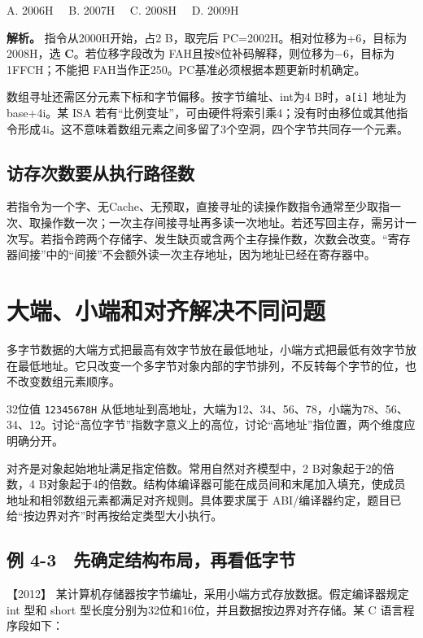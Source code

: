 A. 2006H　 B. 2007H　 C. 2008H　 D. 2009H


\textbf{解析。} 指令从2000H开始，占2 B，取完后 PC=2002H。相对位移为+6，目标为2008H，选 \textbf{C}。若位移字段改为 FAH且按8位补码解释，则位移为−6，目标为1FFCH；不能把 FAH当作正250。PC基准必须根据本题更新时机确定。

数组寻址还需区分元素下标和字节偏移。按字节编址、int为4 B时，\texttt{a{[}i{]}} 地址为base+4i。某 ISA 若有``比例变址''，可由硬件将索引乘4；没有时由移位或其他指令形成4i。这不意味着数组元素之间多留了3个空洞，四个字节共同存一个元素。

\subsection{访存次数要从执行路径数}\label{co-c04-h50}

若指令为一个字、无Cache、无预取，直接寻址的读操作数指令通常至少取指一次、取操作数一次；一次主存间接寻址再多读一次地址。若还写回主存，需另计一次写。若指令跨两个存储字、发生缺页或含两个主存操作数，次数会改变。``寄存器间接''中的``间接''不会额外读一次主存地址，因为地址已经在寄存器中。

\section{大端、小端和对齐解决不同问题}\label{co-04-03}

多字节数据的大端方式把最高有效字节放在最低地址，小端方式把最低有效字节放在最低地址。它只改变一个多字节对象内部的字节排列，不反转每个字节的位，也不改变数组元素顺序。

32位值 \texttt{12345678H} 从低地址到高地址，大端为12、34、56、78，小端为78、56、34、12。讨论``高位字节''指数字意义上的高位，讨论``高地址''指位置，两个维度应明确分开。

对齐是对象起始地址满足指定倍数。常用自然对齐模型中，2 B对象起于2的倍数，4 B对象起于4的倍数。结构体编译器可能在成员间和末尾加入填充，使成员地址和相邻数组元素都满足对齐规则。具体要求属于 ABI/编译器约定，题目已给``按边界对齐''时再按给定类型大小执行。

\subsection{例 4-3　先确定结构布局，再看低字节}\label{co-ex4-3}

\noindent{}【2012】 某计算机存储器按字节编址，采用小端方式存放数据。假定编译器规定 int 型和 short 型长度分别为32位和16位，并且数据按边界对齐存储。某 C 语言程序段如下：


